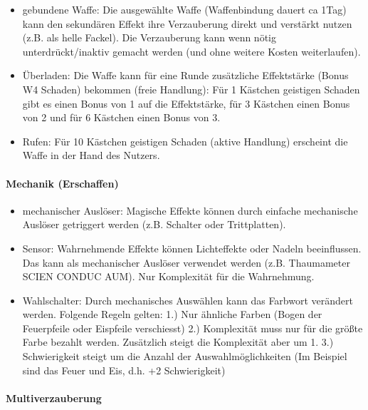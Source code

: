 \documentclass{article}
\begin{document}
\begin{itemize}
\item gebundene Waffe: Die ausgewählte Waffe (Waffenbindung dauert ca 1Tag) kann den sekundären Effekt ihre Verzauberung direkt und verstärkt nutzen (z.B. als helle Fackel). Die Verzauberung kann wenn nötig unterdrückt/inaktiv gemacht werden (und ohne weitere Kosten weiterlaufen).
\item Überladen: Die Waffe kann für eine Runde zusätzliche Effektstärke (Bonus W4 Schaden) bekommen (freie Handlung): Für 1 Kästchen geistigen Schaden gibt es einen Bonus von 1 auf die Effektstärke, für 3 Kästchen einen Bonus von 2 und für 6 Kästchen einen Bonus von 3.
\item Rufen: Für 10 Kästchen geistigen Schaden (aktive Handlung) erscheint die Waffe in der Hand des Nutzers.
\end{itemize}

\paragraph{Mechanik (Erschaffen)}

\begin{itemize}
\item mechanischer Auslöser: Magische Effekte können durch einfache mechanische Auslöser getriggert werden (z.B. Schalter oder Trittplatten).
\item Sensor: Wahrnehmende Effekte können Lichteffekte oder Nadeln beeinflussen. Das kann als mechanischer Auslöser verwendet werden (z.B. Thaumameter SCIEN CONDUC AUM). Nur Komplexität für die Wahrnehmung.
\item Wahlschalter: Durch mechanisches Auswählen kann das Farbwort verändert werden. Folgende Regeln gelten: 1.) Nur ähnliche Farben (Bogen der Feuerpfeile oder Eispfeile verschiesst) 2.) Komplexität muss nur für die größte Farbe bezahlt werden. Zusätzlich steigt die Komplexität aber um 1. 3.) Schwierigkeit steigt um die Anzahl der Auswahlmöglichkeiten (Im Beispiel sind das Feuer und Eis, d.h. +2 Schwierigkeit)
\end{itemize}

\paragraph{Multiverzauberung}
\end{document}
